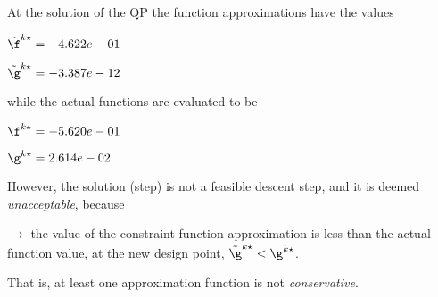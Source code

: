 At the solution of the QP the function approximations have the values

$\tilde \f^{k\star} = -4.622e-01$

$\tilde \g^{k\star} = -3.387e-12$

\bigskip
while the actual functions are evaluated to be

$\f^{k\star} = -5.620e-01$

$\g^{k\star} =  2.614e-02$

\bigskip
 However, the solution (step)                         is not a feasible descent step, and it is deemed                         \emph{unacceptable}, because 
 


 $\to$ the value of the constraint function                             approximation is less than the actual function value, at                             the new design point, $\tilde {\g}^{k\star} < {\g}^{k\star}$.

 \bigskip 

 That is, at least one approximation                         function is not \emph{conservative}.
